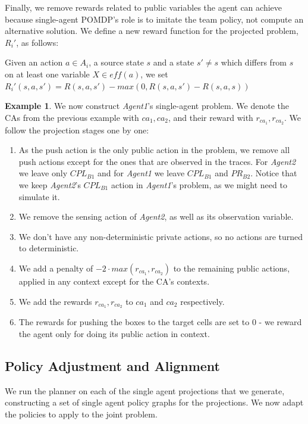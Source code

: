 \documentclass[letterpaper]{article} %
\theoremstyle{definition}
\newtheorem{example}{Example}
\newcommand{\eff}{\mathit{eff}}
\begin{document}
Finally, we remove rewards related to public variables the agent
can achieve because single-agent POMDP's role is to imitate the team policy, not compute an alternative solution.
We define a new reward function for the projected problem, $R_i'$, as follows:

Given an action $a \in A_i$, a source state $s$ and a state $s' \neq s$ which differs from $s$ on at least one variable $X \in \eff(a)$, we set $R_i'(s,a,s') = R(s,a,s') - \textit{max}\left(0, R(s,a,s') - R(s,a,s)\right)$

\begin{example}
We now construct \emph{Agent1}'s single-agent problem. We denote the CAs from the previous example with $ca_1, ca_2$, and their reward with $r_{ca_1}, r_{ca_2}$. We follow the projection stages one by one:
\begin{enumerate}
    \item As the push action is the only public action in the problem, we remove all push actions except for the ones that are observed in the traces. For \emph{Agent2} we leave only $CPL_{B1}$ and for \emph{Agent1} we leave $CPL_{B1}$ and $PR_{B2}$. Notice that we keep \emph{Agent2}'s $CPL_{B1}$ action in \emph{Agent1}'s problem, as we might need to simulate it.
    \item We remove the sensing action of \emph{Agent2}, as well as its observation variable.
    \item We don't have any non-deterministic private actions, so no actions are turned to deterministic.
    \item We add a penalty of $-2\cdot max(r_{ca_1}, r_{ca_2})$ to the remaining public actions, applied in any context except for the CA's contexts.
    \item We add the rewards $r_{ca_1}, r_{ca_2}$ to  $ca_1$ and $ca_2$ respectively.
    \item The rewards for pushing the boxes to the target cells are set to 0 - we reward the agent only for doing its public action in context.
\end{enumerate}
\end{example}


\subsection{Policy Adjustment and Alignment}

We run the planner on each of the single agent projections that we generate, constructing a set of single agent policy graphs for the projections. We now adapt the policies to apply to the joint problem. 
\end{document}
